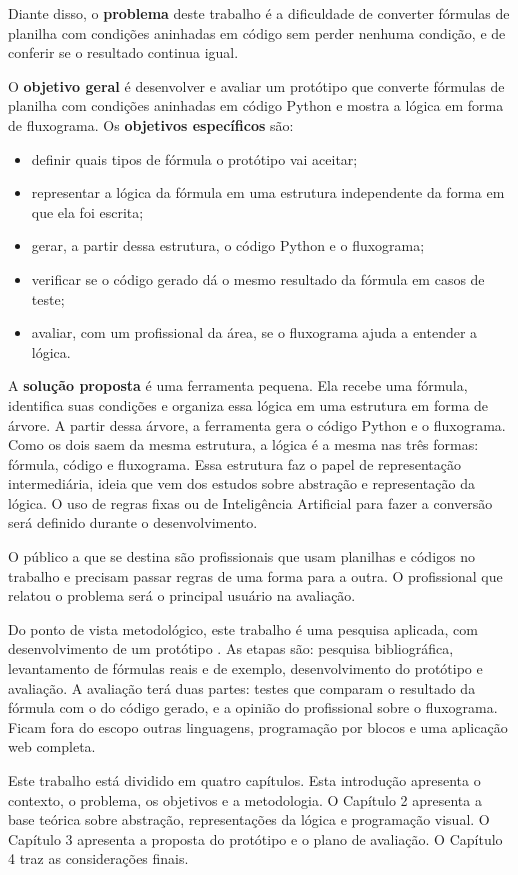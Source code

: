 Diante disso, o \textbf{problema} deste trabalho é a dificuldade de converter fórmulas de planilha com condições aninhadas em código sem perder nenhuma condição, e de conferir se o resultado continua igual.

O \textbf{objetivo geral} é desenvolver e avaliar um protótipo que converte fórmulas de planilha com condições aninhadas em código Python e mostra a lógica em forma de fluxograma. Os \textbf{objetivos específicos} são:

\begin{itemize}
    \item definir quais tipos de fórmula o protótipo vai aceitar;
    \item representar a lógica da fórmula em uma estrutura independente da forma em que ela foi escrita;
    \item gerar, a partir dessa estrutura, o código Python e o fluxograma;
    \item verificar se o código gerado dá o mesmo resultado da fórmula em casos de teste;
    \item avaliar, com um profissional da área, se o fluxograma ajuda a entender a lógica.
\end{itemize}

A \textbf{solução proposta} é uma ferramenta pequena. Ela recebe uma fórmula, identifica suas condições e organiza essa lógica em uma estrutura em forma de árvore. A partir dessa árvore, a ferramenta gera o código Python e o fluxograma. Como os dois saem da mesma estrutura, a lógica é a mesma nas três formas: fórmula, código e fluxograma. Essa estrutura faz o papel de representação intermediária, ideia que vem dos estudos sobre abstração e representação da lógica. O uso de regras fixas ou de Inteligência Artificial para fazer a conversão será definido durante o desenvolvimento.

O público a que se destina são profissionais que usam planilhas e códigos no trabalho e precisam passar regras de uma forma para a outra. O profissional que relatou o problema será o principal usuário na avaliação.

Do ponto de vista metodológico, este trabalho é uma pesquisa aplicada, com desenvolvimento de um protótipo \cite{gil2002,prodanov2013}. As etapas são: pesquisa bibliográfica, levantamento de fórmulas reais e de exemplo, desenvolvimento do protótipo e avaliação. A avaliação terá duas partes: testes que comparam o resultado da fórmula com o do código gerado, e a opinião do profissional sobre o fluxograma. Ficam fora do escopo outras linguagens, programação por blocos e uma aplicação web completa.

Este trabalho está dividido em quatro capítulos. Esta introdução apresenta o contexto, o problema, os objetivos e a metodologia. O Capítulo 2 apresenta a base teórica sobre abstração, representações da lógica e programação visual. O Capítulo 3 apresenta a proposta do protótipo e o plano de avaliação. O Capítulo 4 traz as considerações finais.
